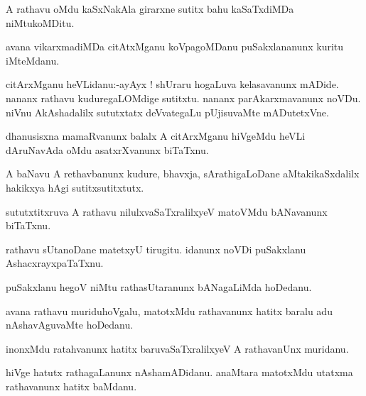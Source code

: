 \documentclass{article}
\begin{document}
\begin{mn}%
A rathavu oMdu kaSxNakAla girarxne sutitx bahu kaSaTxdiMDa niMtukoMDitu.
\end{mn}

\begin{mn}%
avana vikarxmadiMDa citAtxMganu koVpagoMDanu puSakxlananunx kuritu iMteMdanu.
\end{mn}

\begin{mn}%
citArxMganu heVLidanu:-ayAyx ! shUraru hogaLuva kelasavanunx mADide. nananx rathavu 
kuduregaLOMdige sutitxtu. nananx parAkarxmavanunx noVDu. niVnu AkAshadalilx sututxtatx 
deVvategaLu pUjisuvaMte mADutetxVne.
\end{mn}

\begin{mn}%
dhanusisxna mamaRvanunx balalx A citArxMganu hiVgeMdu heVLi dAruNavAda oMdu asatxrXvanunx 
biTaTxnu.
\end{mn}

\begin{mn}%
A baNavu A rethavbanunx kudure, bhavxja, sArathigaLoDane aMtakikaSxdalilx hakikxya hAgi 
sutitxsutitxtutx.
\end{mn}

\begin{mn}%
sututxtitxruva A rathavu nilulxvaSaTxralilxyeV matoVMdu bANavanunx biTaTxnu.
\end{mn}

\begin{mn}%
rathavu sUtanoDane matetxyU tirugitu. idanunx noVDi puSakxlanu AshacxrayxpaTaTxnu.
\end{mn}

\begin{mn}%
puSakxlanu hegoV niMtu rathasUtaranunx bANagaLiMda hoDedanu.
\end{mn}

\begin{mn}%
avana rathavu muriduhoVgalu, matotxMdu rathavanunx hatitx baralu adu nAshavAguvaMte hoDedanu.
\end{mn}

\begin{mn}%
inonxMdu ratahvanunx hatitx baruvaSaTxralilxyeV A rathavanUnx muridanu. 
\end{mn}

\begin{mn}%
hiVge hatutx rathagaLanunx nAshamADidanu. anaMtara matotxMdu utatxma rathavanunx hatitx 
baMdanu.
\end{mn}
\end{document}

